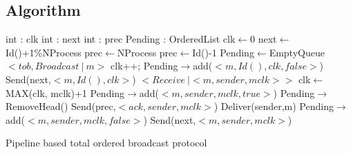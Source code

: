 \documentclass[a4paper]{article}
\begin{document}
\subsection{Algorithm}
\begin{algorithm}[H]
    \centering
    \begin{algorithmic}[5]
        \Data
        \State int : clk
        \State int : next
        \State int : prec
        \State Pending : OrderedList
        \EndData
        \Init
        \State clk$\gets$0
        \State next$\gets$Id()+1\%NProcess
        \State prec$\gets$NProcess
        \Else
        \State prec$\gets$Id()-1
        \EndIf
        \State Pending$\gets$EmptyQueue
        \EndInit
        \Event $< tob,Broadcast\ |\ m> $
        \State clk++;
        \State Pending$\rightarrow$add($<m,Id(), clk, false>$) 
        \State Send(next,$<m,Id(),clk>$)
        \EndEvent
        \Event $<Receive\ | <m,sender, mclk>>$
        \State clk$\gets$MAX(clk, mclk)+1
        \State Pending$\rightarrow$add($<m,sender,mclk,true>$)
        \State Pending$\rightarrow$RemoveHead()
        \State Send(prec,$<ack,sender,mclk>$)
        \State Deliver(sender,m)
        \EndIf
        \Else
        \State Pending$\rightarrow$add($<m,sender,mclk,false>$)
        \State Send(next,$<m,sender,mclk>$)
        \EndIf
        \EndEvent
    \end{algorithmic}
    \caption{Pipeline based total ordered broadcast protocol}
\end{algorithm}
\end{document}
